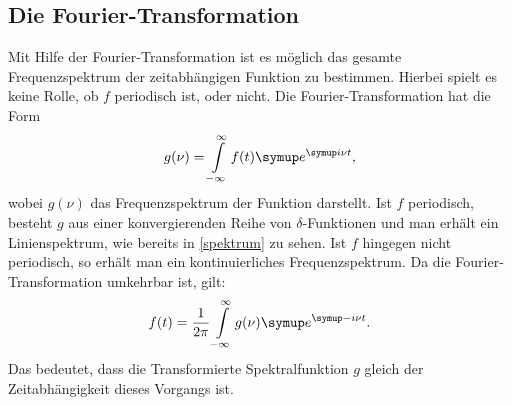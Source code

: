 \subsection{Die Fourier-Transformation}
Mit Hilfe der Fourier-Transformation ist es möglich das gesamte Frequenzspektrum
der zeitabhängigen Funktion zu bestimmen. Hierbei spielt es keine Rolle, ob
$f$ periodisch ist, oder nicht. Die Fourier-Transformation hat die Form
\begin{equation}
  g(\nu) = \int\limits_{-\infty}^{\infty}f(t)\su{e}^{\su{i}\nu t},
\end{equation}
wobei $g(\nu)$ das Frequenzspektrum der Funktion darstellt. Ist $f$ periodisch,
besteht $g$ aus einer konvergierenden Reihe von $\delta$-Funktionen und man
erhält ein Linienspektrum, wie bereits in \ref{spektrum} zu sehen. Ist $f$
hingegen nicht periodisch, so erhält man ein kontinuierliches Frequenzspektrum.
Da die Fourier-Transformation umkehrbar ist, gilt:
\begin{equation}
  f(t) = \frac{1}{2\pi}\int\limits_{-\infty}^\infty g(\nu)\su{e}^{\su{-i}\nu t}.
\end{equation}
Das bedeutet, dass die Transformierte Spektralfunktion $g$ gleich der
Zeitabhängigkeit dieses Vorgangs ist.
